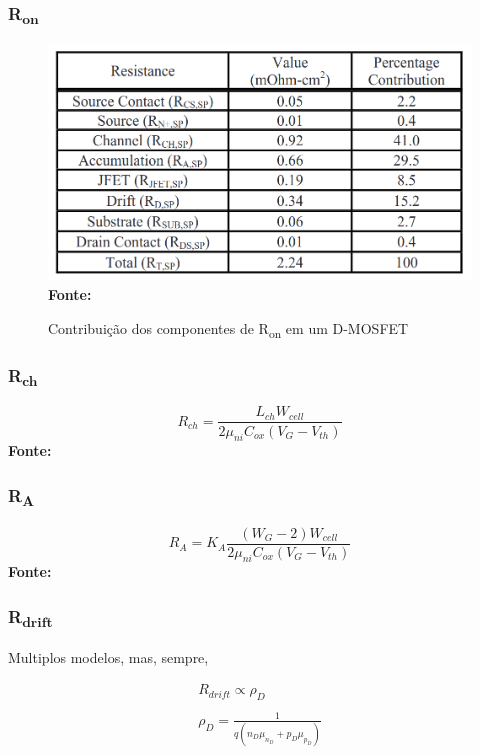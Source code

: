 \begin{frame}
    
    \frametitle{R\textsubscript{on}}

    \begin{figure}[!htbp]
        \centering
        \caption{Contribuição dos componentes de R\textsubscript{on} em um D-MOSFET}
        \includegraphics[scale=0.2]{imagens/rondmos_contribution.png}
        \\\small{\textbf{Fonte:} \cite{baliga2010fundamentals}}%
    \end{figure}

\end{frame}

\begin{frame}
    
    \frametitle{R\textsubscript{ch}}

    \begin{equation}
        R_{ch} = \frac{L_{ch}W_{cell}}{2\mu_{ni}C_{ox}(V_G-V_{th})}
    \end{equation}\small{\textbf{Fonte:} \cite{baliga2010fundamentals}}\\

\end{frame}

\begin{frame}

    \frametitle{R\textsubscript{A}}

    \begin{equation}
        R_{A} = K_A\frac{(W_G-2)W_{cell}}{2\mu_{ni}C_{ox}(V_G-V_{th})}
    \end{equation}\small{\textbf{Fonte:} \cite{baliga2010fundamentals}}\\

\end{frame}

\begin{frame}

    \frametitle{R\textsubscript{drift}}

    Multiplos modelos, mas, sempre,

    \begin{gather}
        R_{drift} \propto \rho_D \\ \ \\
        \rho_D = \frac{1}{q(n_D\mu_{n_D} + p_D\mu_{p_D})}
    \end{gather}

\end{frame}
